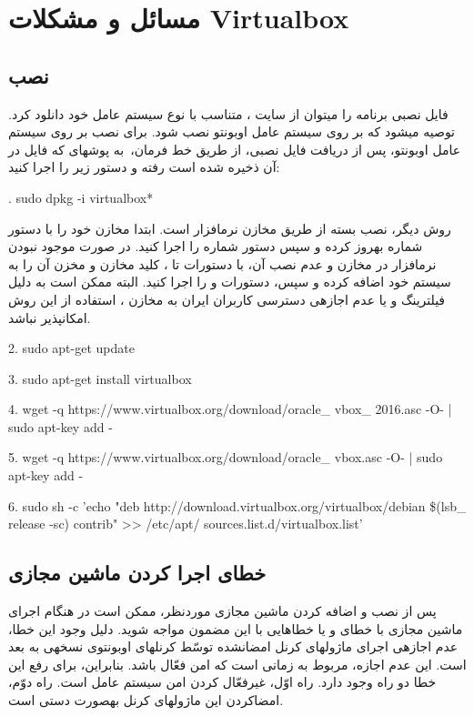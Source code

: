 \chapter{مسائل و مشکلات Virtualbox}
\section{نصب}
\label{vboxA}
فایل نصبی برنامه  را می\nf توان از سایت ، متناسب با نوع سیستم عامل خود دانلود کرد. توصیه می\nf شود که  بر روی سیستم عامل اوبونتو نصب شود. برای نصب بر روی سیستم عامل اوبونتو، پس از دریافت فایل نصبی، از طریق خط فرمان،\ به پوشه\nf ای که فایل در آن ذخیره شده است  رفته و دستور زیر را اجرا کنید:
\begin{latin}
. sudo dpkg -i virtualbox*
\end{latin}

روش دیگر، نصب بسته از طریق مخازن نرم\nf افزار است. ابتدا مخازن خود را با دستور شماره   به\nf روز کرده و سپس دستور شماره  را اجرا کنید. در صورت موجود نبودن نرم\nf افزار  در مخازن و عدم نصب آن، با دستورات  تا ، کلید مخازن  و مخزن آن را به سیستم خود اضافه کرده و سپس، دستورات  و  را اجرا کنید. البته ممکن است به دلیل فیلترینگ و یا عدم اجازه\nf ی دسترسی کاربران ایران به مخازن  ، استفاده از این روش امکان\nf پذیر نباشد.
\begin{latin}
\setlength{\parindent}{0ex}
2. sudo apt-get update

3. sudo apt-get install virtualbox

4. wget -q https://www.virtualbox.org/download/oracle\_ vbox\_ 2016.asc -O- | sudo apt-key add -

5. wget -q https://www.virtualbox.org/download/oracle\_ vbox.asc -O- | sudo apt-key add - 

6. sudo sh -c 'echo "deb http://download.virtualbox.org/virtualbox/debian \$(lsb\_ release -sc) contrib" >> /etc/apt/
sources.list.d/virtualbox.list'
\end{latin}

\section{خطای اجرا کردن ماشین مجازی}
\label{vboxAA}
پس از نصب  و اضافه کردن ماشین مجازی موردنظر، ممکن است در هنگام اجرای ماشین مجازی با خطای  و یا خطاهایی با این مضمون مواجه شوید. دلیل وجود این خطا، عدم اجازه\nf ی اجرای ماژول\nf های کرنل امضانشده توسّط کرنل\nf های اوبونتوی نسخه\nf ی  به بعد است. این عدم اجازه، مربوط به زمانی است که  امن فعّال باشد. بنابراین، برای رفع این خطا دو راه وجود دارد. راه اوّل، غیرفعّال کردن  امن سیستم عامل است. راه دوّم، امضاکردن این ماژولهای  کرنل به\nf صورت دستی است.


